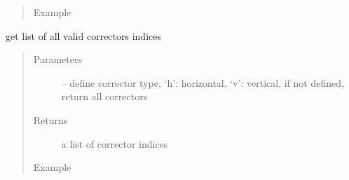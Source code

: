 \documentclass[letterpaper,10pt,english]{sphinxmanual}
\begin{document}
\begin{fulllineitems}
\begin{fulllineitems}
\begin{quote}
\begin{description}
\item[{Example}] \leavevmode
\end{description}\end{quote}

\begin{sphinxVerbatim}[commandchars=\\\{\},formatcom=\scriptsize]
  
\end{sphinxVerbatim}

\end{fulllineitems}


\begin{fulllineitems}
\label{\detokenize{src/apidocs/dakopt:genopt.dakopt.DakotaOC.get_all_cors}}
get list of all valid correctors indices
\begin{quote}\begin{description}
\item[{Parameters}] \leavevmode
{} -- define corrector type, `h': horizontal, `v': vertical, 
if not defined, return all correctors

\item[{Returns}] \leavevmode
a list of corrector indices

\item[{Example}] \leavevmode
\end{description}\end{quote}

\begin{sphinxVerbatim}[commandchars=\\\{\},formatcom=\scriptsize]
  
\end{sphinxVerbatim}

\end{fulllineitems}


\end{fulllineitems}
\end{document}
